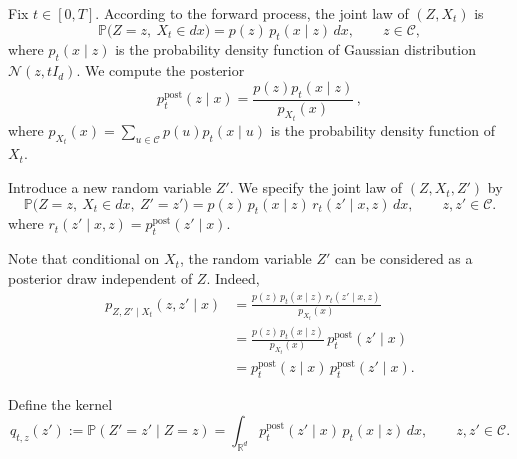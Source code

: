 \documentclass[11pt]{article}
\theoremstyle{definition}
\newcommand{\R}{\mathbb{R}}
\numberwithin{equation}{section}
\begin{document}

Fix $t\in[0,T]$. According to the forward process, the joint law of $(Z,X_t)$ is 
\begin{equation*}
\mathbb{P}\big(Z=z,\ X_t\in dx\big)
=
p(z)\,p_t(x\mid z)\,dx,
\qquad z\in\mathcal C,
\end{equation*}
where $p_{t}(x\mid z)$ is the probability density function of Gaussian distribution 
\(\mathcal{N}(z,tI_d)\). We compute the posterior 
\begin{equation}\label{eq:post}
    p^{\mathrm{post}}_{t}(z\mid x)=\frac{p(z)p_{t}(x\mid z)}{p_{X_t}(x)}\,,
\end{equation}
where $p_{X_t}(x) = \sum_{u\in\mathcal{C}}p(u)p_{t}(x\mid u)$ is the probability density function of $X_t$.

Introduce a new random variable $Z'$. We specify the joint law of $(Z,X_t,Z')$ by 
\begin{equation*}
\mathbb{P}\big(Z=z,\ X_t\in dx,\ Z'=z'\big)
=
p(z)\,p_t(x\mid z)\,r_t(z'\mid x,z)\,dx,
\qquad z,z'\in\mathcal C.
\end{equation*}
where \(r_{t}(z'\mid x,z) = p^{\mathrm{post}}_{t}(z'\mid x)\). 

Note that conditional on $X_t$, the random variable $Z'$ can be considered as a posterior draw independent of $Z$. Indeed,
\begin{align*}
p_{Z,Z'\mid X_t}(z,z'\mid x)
&=
\frac{p(z)\,p_t(x\mid z)\,r_t(z'\mid x,z)}{p_{X_t}(x)}\\%
&=
\frac{p(z)\,p_t(x\mid z)}{p_{X_t}(x)}\, p^{\mathrm{post}}_{t}(z'\mid x) \\
&=
p^{\mathrm{post}}_{t}(z\mid x)\,p^{\mathrm{post}}_{t}(z'\mid x).
\end{align*}

Define the kernel %
\begin{equation*}
q_{t,z}(z')
:= \mathbb{P}(Z'=z'\mid Z=z)
=\int_{\R^d} p^{\mathrm{post}}_t(z'\mid x)\, p_t(x\mid z)\,dx,
\qquad z,z'\in\mathcal C.
\end{equation*}

\end{document}
